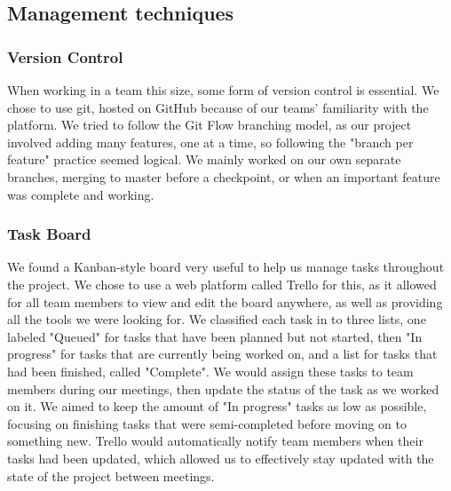 \documentclass{article}
\begin{document}
\subsection{Management techniques}
\subsubsection{Version Control}
When working in a team this size, some form of version control is essential. We chose to use git, hosted on GitHub because of our teams' familiarity with the platform. We tried to follow the Git Flow branching model, as our project involved adding many features, one at a time, so following the "branch per feature" practice seemed logical. We mainly worked on our own separate branches, merging to master before a checkpoint, or when an important feature was complete and working. 
\newpage
\subsubsection{Task Board}
We found a Kanban-style board very useful to help us manage tasks throughout the project. We chose to use a web platform called Trello for this, as it allowed for all team members to view and edit the board anywhere, as well as providing all the tools we were looking for. We classified each task in to three lists, one labeled "Queued" for tasks that have been planned but not started, then "In progress" for tasks that are currently being worked on, and a list for tasks that had been finished, called "Complete". We would assign these tasks to team members during our meetings, then update the status of the task as we worked on it. We aimed to keep the amount of "In progress" tasks as low as possible, focusing on finishing tasks that were semi-completed before moving on to something new. Trello would automatically notify team members when their tasks had been updated, which allowed us to effectively stay updated with the state of the project between meetings. 
\end{document}
